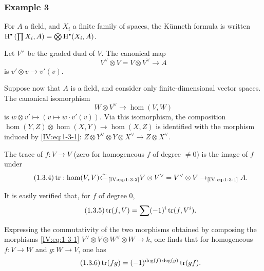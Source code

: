 \subsubsection*{\hypertarget{sga4half.e04.example.1-3-3}{Example 3}}

For $A$ a field, and $X_i$ a finite family of spaces, the K\"unneth formula
is written
$\h^\bullet\left(\prod X_i,A\right) = \bigotimes \h^\bullet(X_i,A)$.

Let $V^\vee$ be the graded dual of $V$. The canonical map
\begin{equation*}\tag{1.3.1}\label{IV:eq:1-3-1}
  V^\vee\otimes V = V\otimes V^\vee \to A
\end{equation*}
is $v'\otimes v\to v'(v)$.

Suppose now that $A$ is a field, and consider only finite-dimensional vector
spaces. The canonical isomorphism
\begin{equation*}\tag{1.3.2}\label{IV:eq:1-3-2}
  W\otimes V^\vee \to \hom(V,W)
\end{equation*}
is $w\otimes v'\mapsto \left(v\mapsto w\cdot v'(v)\right)$. Via this
isomorphism, the composition
$\hom(Y,Z)\otimes \hom(X,Y)\to \hom(X,Z)$ is identified with the morphism
induced by \eqref{IV:eq:1-3-1}:
$Z\otimes Y^\vee\otimes Y\otimes X^\vee \to Z\otimes X^\vee$.

The trace of $f:V\to V$ (zero for homogeneous $f$ of degree $\ne 0$) is
the image of $f$ under
\begin{equation*}\tag{1.3.4}\label{IV:eq:1-3-4}
  \operatorname{tr}:\hom(V,V) {\xleftarrow\sim}_\text{\eqref{IV:eq:1-3-2}} V\otimes V^\vee = V^\vee \otimes V \to_\text{\eqref{IV:eq:1-3-1}} A .
\end{equation*}

It is easily verified that, for $f$ of degree $0$,
\begin{equation*}\tag{1.3.5}\label{IV:eq:1-3-5}
  \operatorname{tr}(f,V) = \sum (-1)^i \operatorname{tr}(f,V^i) \text{.}
\end{equation*}

Expressing the commutativity of the two morphisms obtained by composing the
morphisms \eqref{IV:eq:1-3-1}
$V^\vee\otimes V\otimes W^\vee\otimes W\to k$, one finds that for homogeneous
$f:V\to W$ and $g:W\to V$, one has
\begin{equation*}\tag{1.3.6}\label{IV:eq:1-3-6}
  \operatorname{tr}(f g) = (-1)^{\deg(f)\deg(g)} \operatorname{tr}(g f) \text{.}
\end{equation*}




















